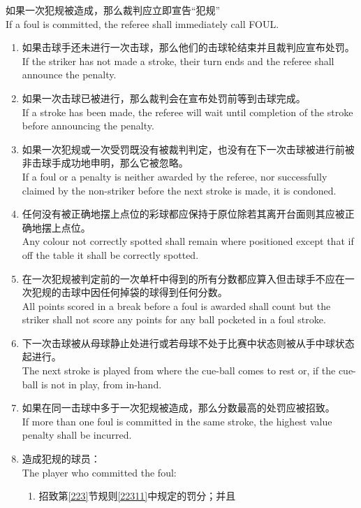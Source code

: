 \noindent 如果一次犯规被造成，那么裁判应立即宣告``犯规''\\
If a foul is committed, the referee shall immediately call FOUL.
\begin{enumerate}[label=(\alph*)]
    \item 如果击球手还未进行一次击球，那么他们的击球轮结束并且裁判应宣布处罚。\\
    If the striker has not made a stroke, their turn ends and the referee shall announce the penalty.
    \item 如果一次击球已被进行，那么裁判会在宣布处罚前等到击球完成。\\
    If a stroke has been made, the referee will wait until completion of the stroke before announcing the penalty.
    \item 如果一次犯规或一次受罚既没有被裁判判定，也没有在下一次击球被进行前被非击球手成功地申明，那么它被忽略。\\
    If a foul or a penalty is neither awarded by the referee, nor successfully claimed by the non-striker before the next stroke is made, it is condoned.
    \item 任何没有被正确地摆上点位的彩球都应保持于原位除若其离开台面则其应被正确地摆上点位。\\
    Any colour not correctly spotted shall remain where positioned except that if off the table it shall be correctly spotted.
    \item 在一次犯规被判定前的一次单杆中得到的所有分数都应算入但击球手不应在一次犯规的击球中因任何掉袋的球得到任何分数。\\
    All points scored in a break before a foul is awarded shall count but the striker shall not score any points for any ball pocketed in a foul stroke.
    \item 下一次击球被从母球静止处进行或若母球不处于比赛中状态则被从手中球状态起进行。\\
    The next stroke is played from where the cue-ball comes to rest or, if the cue-ball is not in play, from in-hand.
    \item 如果在同一击球中多于一次犯规被造成，那么分数最高的处罚应被招致。\\
    If more than one foul is committed in the same stroke, the highest value penalty shall be incurred.
    \item 造成犯规的球员：\\
    The player who committed the foul:
    \begin{enumerate}[label=(\roman*)]
        \item 招致第\ref{223}节规则\ref{22311}中规定的罚分；并且\\

\end{enumerate}
\end{enumerate}
